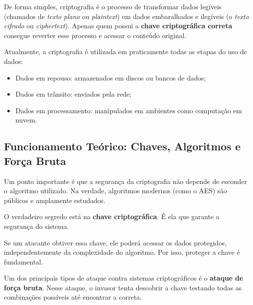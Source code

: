 \documentclass[12pt,a4paper,twoside]{report}
\begin{document}
De forma simples, criptografia é o processo de transformar dados legíveis (chamados de \textit{texto plano} ou \textit{plaintext}) em dados embaralhados e ilegíveis (o \textit{texto cifrado} ou \textit{ciphertext}). Apenas quem possui a \textbf{chave criptográfica correta} consegue reverter esse processo e acessar o conteúdo original.

Atualmente, a criptografia é utilizada em praticamente todas as etapas do uso de dados:
\begin{itemize}
    \item Dados em repouso: armazenados em discos ou bancos de dados;
    \item Dados em trânsito: enviados pela rede;
    \item Dados em processamento: manipulados em ambientes como computação em nuvem.
\end{itemize}

\subsection{Funcionamento Teórico: Chaves, Algoritmos e Força Bruta}
Um ponto importante é que a segurança da criptografia não depende de esconder o algoritmo utilizado. Na verdade, algoritmos modernos (como o AES) são públicos e amplamente estudados.

O verdadeiro segredo está na \textbf{chave criptográfica}. É ela que garante a segurança do sistema.

Se um atacante obtiver essa chave, ele poderá acessar os dados protegidos, independentemente da complexidade do algoritmo. Por isso, proteger a chave é fundamental.

Um dos principais tipos de ataque contra sistemas criptográficos é o \textbf{ataque de força bruta}. Nesse ataque, o invasor tenta descobrir a chave testando todas as combinações possíveis até encontrar a correta.
\end{document}
